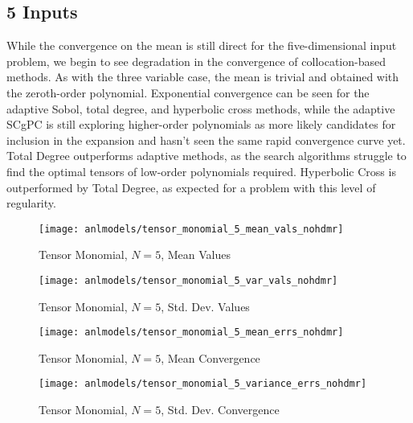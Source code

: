 \subsection{5 Inputs}
While the convergence on the mean is still direct for the five-dimensional input problem, we begin to see
degradation in the convergence of collocation-based methods.  
As with the three variable case, the mean is trivial and obtained with the zeroth-order polynomial.  Exponential
convergence can be seen for the adaptive Sobol, total degree, and hyperbolic cross methods, while the adaptive SCgPC
is still exploring higher-order polynomials as more likely candidates for inclusion in the expansion and hasn't
seen the same rapid convergence curve yet.
Total Degree outperforms adaptive methods, as
the search algorithms struggle to find the optimal tensors of low-order polynomials required.  Hyperbolic
Cross is outperformed by Total Degree, as expected for a problem with this level of regularity.
\begin{figure}[H]
  \centering
  \texttt{[image: anlmodels/tensor\_monomial\_5\_mean\_vals\_nohdmr]}
  \caption{Tensor Monomial, $N=5$, Mean Values}
  \label{fig:tensormono mean values 5}
\end{figure}
\begin{figure}[H]
  \centering
  \texttt{[image: anlmodels/tensor\_monomial\_5\_var\_vals\_nohdmr]}
  \caption{Tensor Monomial, $N=5$, Std. Dev. Values}
  \label{fig:tensormono var values 5}
\end{figure}

\begin{figure}[H]
  \centering
  \texttt{[image: anlmodels/tensor\_monomial\_5\_mean\_errs\_nohdmr]}
  \caption{Tensor Monomial, $N=5$, Mean Convergence}
  \label{fig:tensormono mean errors 5}
\end{figure}
\begin{figure}[H]
  \centering
  \texttt{[image: anlmodels/tensor\_monomial\_5\_variance\_errs\_nohdmr]}
  \caption{Tensor Monomial, $N=5$, Std. Dev. Convergence}
  \label{fig:tensormono var errors 5}
\end{figure}

